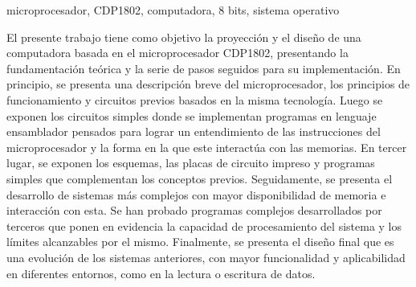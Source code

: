 
\begin{resumen}{microprocesador, CDP1802, computadora, 8 bits, sistema operativo}


El presente trabajo tiene como objetivo la proyección y el diseño de una computadora basada en el microprocesador CDP1802, presentando la fundamentación teórica y la serie de pasos seguidos para su implementación. En principio, se presenta una descripción breve del microprocesador, los principios de funcionamiento y circuitos previos basados en la misma tecnología. Luego se exponen los circuitos simples donde se implementan programas en lenguaje ensamblador pensados para lograr un entendimiento de las instrucciones del microprocesador y la forma en la que este interactúa con las memorias. En tercer lugar, se exponen los esquemas, las placas de circuito impreso y programas simples que complementan los conceptos previos. Seguidamente, se presenta el desarrollo de sistemas más complejos con mayor disponibilidad de memoria e interacción con esta. Se han probado programas complejos desarrollados por terceros que ponen en evidencia la capacidad de procesamiento del sistema y los límites alcanzables por el mismo. Finalmente, se presenta el diseño final que es una evolución de los sistemas anteriores, con mayor funcionalidad y aplicabilidad en diferentes entornos, como en la lectura o escritura de datos. 
\end{resumen}